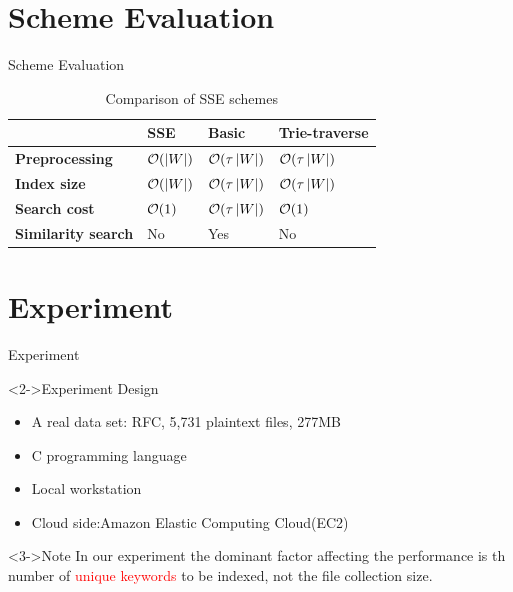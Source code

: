 \documentclass[handout]{beamer}
\begin{document}
\section{Scheme Evaluation}

\begin{frame}{Scheme Evaluation}
	\begin{table}
		\begin{tabular}{l l l l}
			\toprule
			{} & \textbf{SSE} & \textbf{Basic} & \textbf{Trie-traverse}\\
			\midrule
			 \textbf{Preprocessing} & ${\cal O}(\left| W \right|)$ & ${\cal O}(\tau \left| W \right|)$ & ${\cal O}(\tau \left| W \right|)$ \\
			 \textbf{Index size} & ${\cal O}(\left| W \right|)$ & ${\cal O}(\tau \left| W \right|)$ & ${\cal O}(\tau \left| W \right|)$ \\
			 \textbf{Search cost} & ${\cal O}(1)$ & ${\cal O}(\tau \left| W \right|)$ & \textcolor{red}{${\cal O}(1)$}  \\
			 \textbf{Similarity search} & No & Yes & No \\
			\bottomrule
		\end{tabular}
		\caption{Comparison of SSE schemes}
	\end{table}

\end{frame}

\section{Experiment}

\begin{frame}{Experiment}
		\begin{block}<2->{Experiment Design}
			\begin{itemize}
				\item A real data set: RFC, 5,731 plaintext files, 277MB
				\item C programming language 
				\item Local workstation
				\item Cloud side:Amazon Elastic Computing Cloud(EC2)
			\end{itemize}
		\end{block}
		\begin{exampleblock}<3->{Note}
			In our experiment the dominant factor affecting the performance is th number of \textcolor{red}{unique keywords} to be indexed, not the \textcolor[rgb]{0.1,0.7,0.2}{file collection size}.
		\end{exampleblock}
\end{frame}
\end{document}
